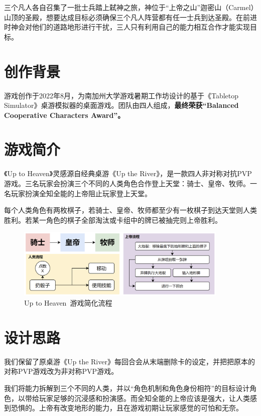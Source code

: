 

三个凡人各自召集了一批士兵踏上弑神之旅，神位于“上帝之山”迦密山（Carmel）山顶的圣殿，想要达成目标必须确保三个凡人阵营都有任一士兵到达圣殿。在前进时神会对他们的道路地形进行干扰，三人只有利用自己的能力相互合作才能实现目标。

\section{创作背景}
游戏创作于2022年8月，为南加州大学游戏暑期工作坊设计的基于《Tabletop Simulator》桌游模拟器的桌面游戏。团队由四人组成，\textbf{最终荣获“Balanced Cooperative Characters Award”。}

\section{游戏简介}
《Up to Heaven》灵感源自经典桌游《Up the River》，是一款四人非对称对抗PVP游戏。三名玩家会扮演三个不同的人类角色合作登上天堂：骑士、皇帝、牧师。一名玩家扮演全知全能的上帝阻止玩家登上天堂。

每个人类角色有两枚棋子，若骑士、皇帝、牧师都至少有一枚棋子到达天堂则人类胜利。若某一角色的棋子全部淘汰或卡组中的牌已被抽完则上帝胜利。

\begin{figure}[H]
    \centering
    \includegraphics[width=0.9\textwidth]{Images/Up to Heaven/preocess.png}
    \caption{Up to Heaven\ 游戏简化流程}
    \label{fig:UTH_Process}
\end{figure}

\section{设计思路}
我们保留了原桌游《Up the River》每回合会从末端删除卡的设定，并把把原本的对称PVP游戏改为非对称PVP游戏。

我们将能力拆解到三个不同的人类，并以“角色机制和角色身份相符”的目标设计角色，以带给玩家足够的沉浸感和扮演感。而全知全能的上帝应该是强大，让人类感到恐惧的。上帝有改变地形的能力，且在游戏初期让玩家感觉的可怕和无奈。

